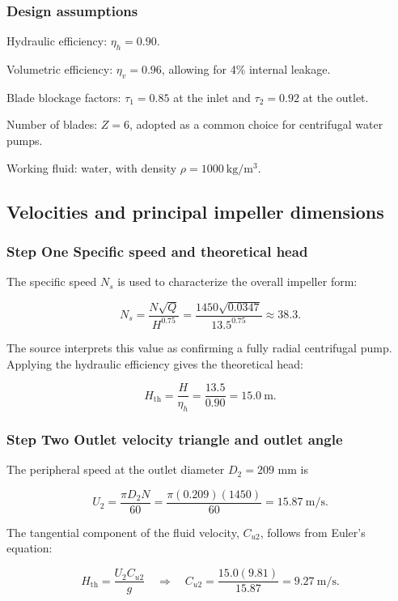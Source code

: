 \documentclass[11pt,a4paper]{article}
\begin{document}
\subsubsection{Design assumptions}

Hydraulic efficiency: $\eta_h=0.90$.

Volumetric efficiency: $\eta_v=0.96$, allowing for 4\% internal leakage.

Blade blockage factors: $\tau_1=0.85$ at the inlet and $\tau_2=0.92$ at the outlet.

Number of blades: $Z=6$, adopted as a common choice for centrifugal water pumps.

Working fluid: water, with density $\rho=1000\ \mathrm{kg/m^3}$.

\subsection{Velocities and principal impeller dimensions}

\subsubsection{Step One Specific speed and theoretical head}

The specific speed $N_s$ is used to characterize the overall impeller form:

\[N_s=\frac{N\sqrt{Q}}{H^{0.75}}=\frac{1450\sqrt{0.0347}}{13.5^{0.75}}\approx38.3.\]

The source interprets this value as confirming a fully radial centrifugal pump. Applying the hydraulic efficiency gives the theoretical head:

\[H_{\mathrm{th}}=\frac{H}{\eta_h}=\frac{13.5}{0.90}=15.0\ \mathrm{m}.\]

\subsubsection{Step Two Outlet velocity triangle and outlet angle}

The peripheral speed at the outlet diameter $D_2=209$ mm is

\[U_2=\frac{\pi D_2N}{60}=\frac{\pi(0.209)(1450)}{60}=15.87\ \mathrm{m/s}.\]

The tangential component of the fluid velocity, $C_{u2}$, follows from Euler's equation:

\[H_{\mathrm{th}}=\frac{U_2C_{u2}}{g}\quad\Longrightarrow\quad C_{u2}=\frac{15.0(9.81)}{15.87}=9.27\ \mathrm{m/s}.\]
\end{document}
